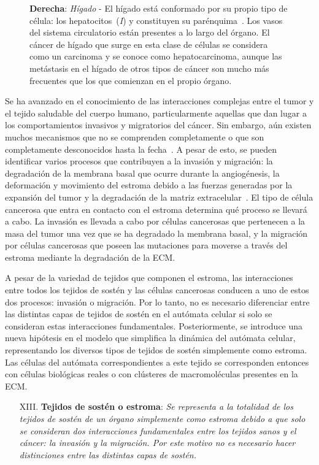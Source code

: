 \begin{figure}[!ht]
{\textbf{Derecha}: \textit{H\'igado} - El h\'igado est\'a conformado por su propio tipo de c\'elula: los hepatocitos~(\emph{I}) y constituyen su par\'enquima~\cite{liver}. Los vasos del sistema circulatorio est\'an presentes a lo largo del \'organo. El c\'ancer de h\'igado que surge en esta clase de c\'elulas se considera como un carcinoma y se conoce como hepatocarcinoma, aunque las met\'astasis en el h\'igado de otros tipos de c\'ancer son mucho m\'as frecuentes que los que comienzan en el propio \'organo.}
\label{fig-structure}
\end{figure}

Se ha avanzado en el conocimiento de las interacciones complejas entre el tumor y el tejido saludable del cuerpo humano, particularmente aquellas que dan lugar a los comportamientos invasivos y migratorios del cáncer. Sin embargo, aún existen muchos mecanismos que no se comprenden completamente o que son completamente desconocidos hasta la fecha~\cite{kansal3}. A pesar de esto, se pueden identificar varios procesos que contribuyen a la invasión y migración: la degradación de la membrana basal que ocurre durante la angiogénesis, la deformación y movimiento del estroma debido a las fuerzas generadas por la expansión del tumor y la degradación de la matriz extracelular~\cite{kansal3}. El tipo de célula cancerosa que entra en contacto con el estroma determina qué proceso se llevará a cabo. La invasión es llevada a cabo por células cancerosas que pertenecen a la masa del tumor una vez que se ha degradado la membrana basal, y la migración por células cancerosas que poseen las mutaciones para moverse a través del estroma mediante la degradación de la ECM.

A pesar de la variedad de tejidos que componen el estroma, las interacciones entre todos los tejidos de sostén y las células cancerosas conducen a uno de estos dos procesos: invasión o migración. Por lo tanto, no es necesario diferenciar entre las distintas capas de tejidos de sostén en el autómata celular si solo se consideran estas interacciones fundamentales. Posteriormente, se introduce una nueva hipótesis en el modelo que simplifica la dinámica del autómata celular, representando los diversos tipos de tejidos de sostén simplemente como estroma. Las células del autómata correspondientes a este tejido se corresponden entonces con células biológicas reales o con clústeres de macromoléculas presentes en la ECM.

\begin{itemize}
\item [{XIII.}] \textbf{Tejidos de sost\'en o estroma}: \emph{Se representa a la totalidad de los tejidos de sost\'en de un \'organo simplemente como estroma debido a que solo se consideran dos interacciones fundamentales entre los tejidos sanos y el c\'ancer: la invasi\'on y la migraci\'on. Por este motivo no es necesario hacer distinciones entre las distintas capas de sost\'en.} \label{XIII}
\end{itemize}

